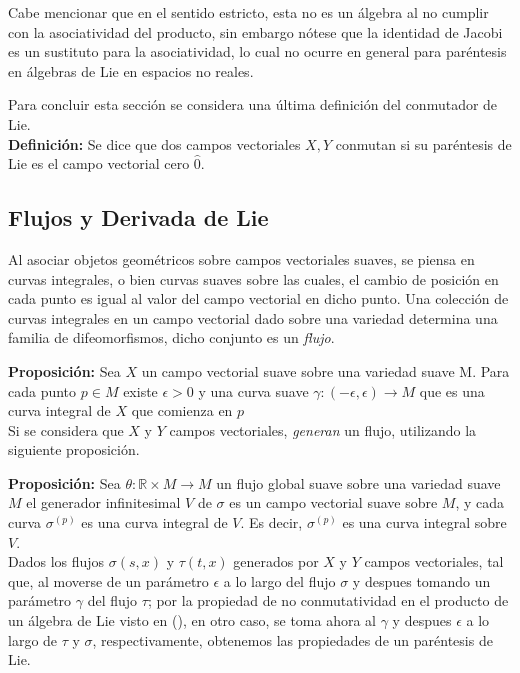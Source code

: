 \documentclass{report}
\begin{document}
{Cabe mencionar que en el sentido estricto, esta no es un álgebra al no cumplir con la asociatividad del producto, sin embargo nótese que la identidad de Jacobi es un sustituto para la asociatividad, lo cual no ocurre en general para paréntesis en álgebras de Lie en espacios no reales. 

Para concluir esta sección se considera una última definición del conmutador de Lie.\\

\textbf{Definición:} Se dice que dos campos vectoriales $X, Y$ conmutan si su paréntesis de Lie es el campo vectorial cero $\hat 0$.\\

\subsection{Flujos y Derivada de Lie}


Al asociar objetos geométricos sobre campos vectoriales suaves, se piensa en curvas integrales, o bien curvas suaves sobre las cuales, el cambio de posición en cada punto es igual al valor del campo vectorial en dicho punto. Una colección de curvas integrales en un campo vectorial dado sobre una variedad determina una familia de difeomorfismos, dicho conjunto es un \textit{flujo}. 




\textbf{Proposición:} Sea $X$ un campo vectorial suave sobre una variedad suave M. Para cada punto $p \in M$ existe $\epsilon > 0$ y una curva suave $\gamma:(-\epsilon , \epsilon) \rightarrow M$ que es una curva integral de $X$ que comienza en $p$\\

Si se considera que $X$ y $Y$ campos vectoriales, \textit{generan} un flujo, utilizando la siguiente proposición.

\textbf{Proposición:} Sea $\theta : \mathbb{R} \times M \rightarrow M$ un flujo global suave sobre una variedad suave $M$ el generador infinitesimal $V$ de $\sigma$ es un campo vectorial suave sobre $M$, y cada curva $\sigma ^{(p)}$ es una curva integral de $V$. Es decir, $\sigma^{(p)}$ es una curva integral sobre $V$.\\

Dados los flujos $\sigma (s,x)$ y $\tau(t,x)$ generados por $X$ y $Y$ campos vectoriales, tal que, al moverse de un parámetro $\epsilon$ a lo largo del flujo $\sigma$ y despues tomando un parámetro $\gamma$ del flujo $\tau$; por la propiedad de no conmutatividad en el producto de un álgebra de Lie visto en (), en otro caso, se toma ahora al $\gamma$ y despues $\epsilon$ a lo largo de $\tau$ y $\sigma$, respectivamente, obtenemos las propiedades de un paréntesis de Lie. 

}
\end{document}
